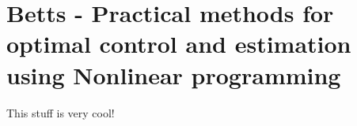 \section{Betts - Practical methods for optimal control and estimation using Nonlinear programming \cite{betts2010practical}}
This stuff is very cool!